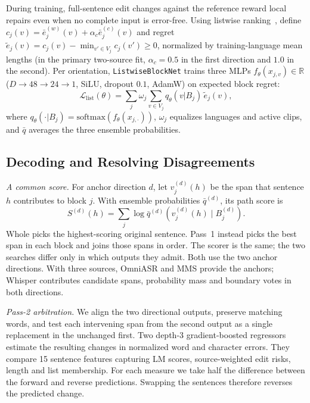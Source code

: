 \documentclass[conference,letterpaper]{IEEEtran}
\begin{document}
During training, full-sentence edit changes against the reference reward local repairs even when no complete input is error-free. Using listwise ranking~\cite{cao2007listnet}, define $c_j(v)=\bar{e}_j^{(w)}(v)+\alpha_c\bar{e}_j^{(c)}(v)$ and regret $\tilde{e}_j(v)=c_j(v)-\min_{v'\in V_j}c_j(v')\ge 0$, normalized by training-language mean lengths (in the primary two-source fit, $\alpha_c=0.5$ in the first direction and $1.0$ in the second). Per orientation, \texttt{ListwiseBlockNet} trains three MLPs $f_\theta(x_{j,v})\in\mathbb{R}$ ($D\to 48\to 24\to 1$, SiLU, dropout $0.1$, AdamW) on expected block regret:
\begin{equation}
\mathcal{L}_{\mathrm{list}}(\theta)=\sum_{j}\omega_j\sum_{v\in V_j}q_\theta(v|B_j)\,\tilde{e}_j(v),
\label{eq:listwise}
\end{equation}
where $q_\theta(\cdot|B_j)=\mathrm{softmax}(f_\theta(x_{j,\cdot}))$, $\omega_j$ equalizes languages and active clips, and $\bar q$ averages the three ensemble probabilities.

\subsection{Decoding and Resolving Disagreements}
\emph{A common score.} For anchor direction $d$, let $v_j^{(d)}(h)$ be the span that sentence $h$ contributes to block $j$. With ensemble probabilities $\bar q^{(d)}$, its path score is
\begin{equation}
S^{(d)}(h)=\sum_j\log\bar q^{(d)}\!\left(v_j^{(d)}(h)\mid B_j^{(d)}\right).
\label{eq:path}
\end{equation}
Whole picks the highest-scoring original sentence. Pass~1 instead picks the best span in each block and joins those spans in order. The scorer is the same; the two searches differ only in which outputs they admit. Both use the two anchor directions. With three sources, OmniASR and MMS provide the anchors; Whisper contributes candidate spans, probability mass and boundary votes in both directions.

\emph{Pass-2 arbitration.} We align the two directional outputs, preserve matching words, and test each intervening span from the second output as a single replacement in the unchanged first. Two depth-3 gradient-boosted regressors estimate the resulting changes in normalized word and character errors. They compare 15 sentence features capturing LM scores, source-weighted edit risks, length and list membership. For each measure we take half the difference between the forward and reverse predictions. Swapping the sentences therefore reverses the predicted change.
\end{document}

